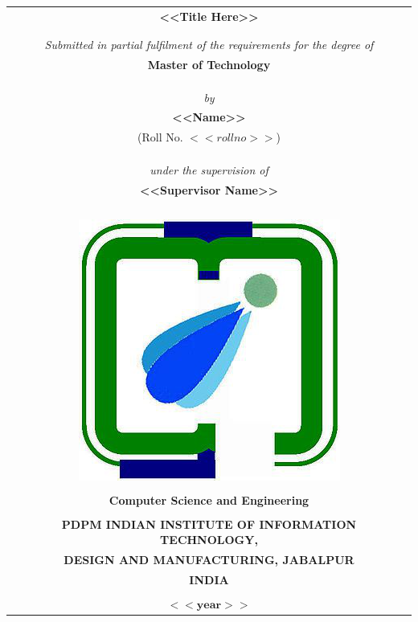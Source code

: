 
\begin{titlepage}
\thispagestyle{empty}


\begin{table}
	\centering
	\begin{tabular}{c}
		\Large \textbf{<<Title Here>>} \\
		\\
		\\
		\it Submitted in partial fulfilment of the requirements for the degree of	\\
		\bf Master of Technology	\\
		\\
		\\
		\\
		\it by	\\
		\large \bf {<<Name>>}	\\
		(Roll No. $<<roll no>>$)	\\
		\\
		\\
		\\
		\it under the supervision of	\\
		\large \bf <<Supervisor Name>>	\\

		\\
		\\
		\\
		\\
		\includegraphics[width=.17\textwidth]{images/iiitdmj.png}	\\
		\\
		\normalsize{\textbf{Computer Science and Engineering}}	\\
		\\
		\bf PDPM INDIAN INSTITUTE OF INFORMATION TECHNOLOGY,	\\
		\bf DESIGN AND MANUFACTURING, JABALPUR	\\
		\bf INDIA	\\
		\\
		$\mathbf{<<year>>}$	\\
	\end{tabular}
\end{table}
\pagebreak


\thispagestyle{empty}
\end{titlepage}

